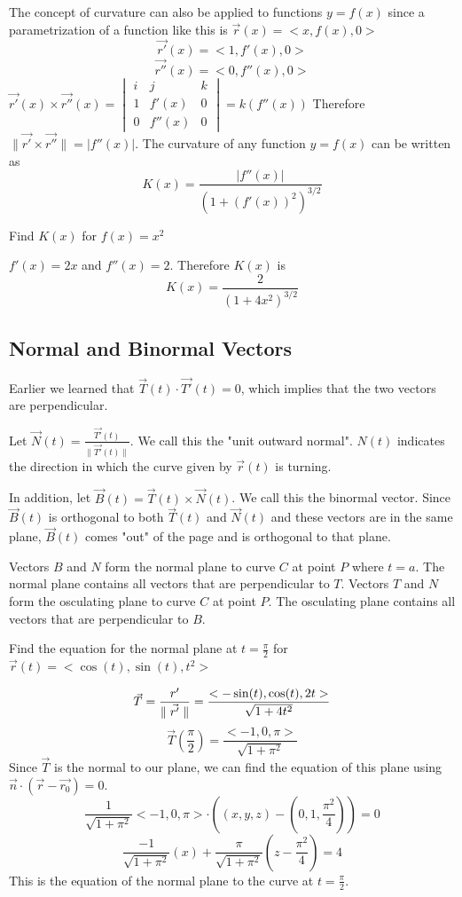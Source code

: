 \documentclass[12 pt]{article}
\begin{document}
        The concept of curvature can also be applied to functions $y=f(x)$ since a parametrization of a function like this is $\vec{r}(x)=<x,f(x),0>$
        $$\vec{r'}(x)=<1,f'(x),0>$$
        $$\vec{r''}(x)=<0,f''(x),0>$$
        $\vec{r'}(x)\times\vec{r''}(x)=
        \begin{vmatrix}
            i & j & k \\
            1 & f'(x) & 0 \\
            0 & f''(x) & 0
        \end{vmatrix}
        =k(f''(x))$
        Therefore $\parallel\vec{r'}\times\vec{r''}\parallel=\lvert f''(x)\rvert$. The curvature of any function $y=f(x)$ can be written as
        $$K(x)=\frac{\lvert f''(x)\rvert}{(1+(f'(x))^2)^{3/2}}$$
        \begin{exmp*}
            Find $K(x)$ for $f(x)=x^2$

            $f'(x)=2x$ and $f''(x)=2$. Therefore $K(x)$ is
            $$K(x)=\frac{2}{(1+4x^2)^{3/2}}$$
        \end{exmp*}

        \subsection{Normal and Binormal Vectors}

        Earlier we learned that $\vec{T}(t)\cdot\vec{T'}(t)=0$, which implies that the two vectors are perpendicular.

        Let $\vec{N}(t)=\frac{\vec{T'}(t)}{\parallel\vec{T'}(t)\parallel}$. We call this the "unit outward normal". $N(t)$ indicates the direction in which the curve given by $\vec{r}(t)$ is turning.

        In addition, let $\vec{B}(t)=\vec{T}(t)\times\vec{N}(t)$. We call this the binormal vector. Since $\vec{B}(t)$ is orthogonal to both $\vec{T}(t)$ and $\vec{N}(t)$ and these vectors are in the same plane, $\vec{B}(t)$ comes "out" of the page and is orthogonal to that plane.

        Vectors $B$ and $N$ form the normal plane to curve $C$ at point $P$ where $t=a$. The normal plane contains all vectors that are perpendicular to $T$.
        Vectors $T$ and $N$ form the osculating plane to curve $C$ at point $P$. The osculating plane contains all vectors that are perpendicular to $B$.

        \begin{exmp*}Find the equation for the normal plane at $t=\frac{\pi}{2}$ for $\vec{r}(t)=<\cos(t),\sin(t),t^2>$

            $$\vec{T}=\frac{r'}{\parallel \vec{r'} \parallel}=\frac{<-\sin(t),\cos(t),2t>}{\sqrt{1+4t^2}}$$
            $$\vec{T}(\frac{\pi}{2})=\frac{<-1,0,\pi>}{\sqrt{1+\pi^2}}$$
            Since $\vec{T}$ is the normal to our plane, we can find the equation of this plane using $\vec{n}\cdot(\vec{r}-\vec{r_0})=0$.
            $$\frac{1}{\sqrt{1+\pi^2}}<-1,0,\pi>\cdot((x,y,z)-(0,1,\frac{\pi^2}{4}))=0$$
            $$\frac{-1}{\sqrt{1+\pi^2}}(x)+\frac{\pi}{\sqrt{1+\pi^2}}(z-\frac{\pi^2}{4})=4$$
            This is the equation of the normal plane to the curve at $t=\frac{\pi}{2}$.
        \end{exmp*}
\end{document}
